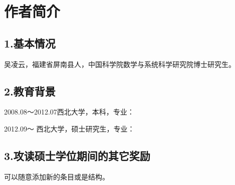 \chapter{作者简介}

\section*{1.基本情况}

吴凌云，福建省屏南县人，中国科学院数学与系统科学研究院博士研究生。

\section*{2.教育背景}

2008.08～2012.07西北大学，本科，专业：

2012.09～       西北大学，硕士研究生，专业：

\section*{3.攻读硕士学位期间的其它奖励}

可以随意添加新的条目或是结构。


\cleardoublepage[plain]%

